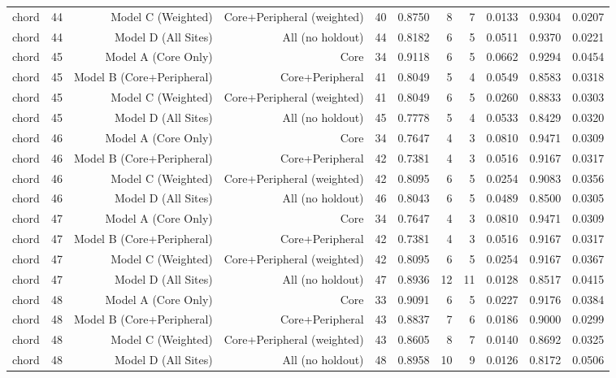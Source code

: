 {\begin{longtable}{lrrrrrrrrrr}
  chord & 44 & Model C (Weighted) & Core+Peripheral (weighted) & 40 & 0.8750 & 8 & 7 & 0.0133 & 0.9304 & 0.0207 \\
  chord & 44 & Model D (All Sites) & All (no holdout) & 44 & 0.8182 & 6 & 5 & 0.0511 & 0.9370 & 0.0221 \\
  chord & 45 & Model A (Core Only) & Core & 34 & 0.9118 & 6 & 5 & 0.0662 & 0.9294 & 0.0454 \\
  chord & 45 & Model B (Core+Peripheral) & Core+Peripheral & 41 & 0.8049 & 5 & 4 & 0.0549 & 0.8583 & 0.0318 \\
  chord & 45 & Model C (Weighted) & Core+Peripheral (weighted) & 41 & 0.8049 & 6 & 5 & 0.0260 & 0.8833 & 0.0303 \\
  chord & 45 & Model D (All Sites) & All (no holdout) & 45 & 0.7778 & 5 & 4 & 0.0533 & 0.8429 & 0.0320 \\
  chord & 46 & Model A (Core Only) & Core & 34 & 0.7647 & 4 & 3 & 0.0810 & 0.9471 & 0.0309 \\
  chord & 46 & Model B (Core+Peripheral) & Core+Peripheral & 42 & 0.7381 & 4 & 3 & 0.0516 & 0.9167 & 0.0317 \\
  chord & 46 & Model C (Weighted) & Core+Peripheral (weighted) & 42 & 0.8095 & 6 & 5 & 0.0254 & 0.9083 & 0.0356 \\
  chord & 46 & Model D (All Sites) & All (no holdout) & 46 & 0.8043 & 6 & 5 & 0.0489 & 0.8500 & 0.0305 \\
  chord & 47 & Model A (Core Only) & Core & 34 & 0.7647 & 4 & 3 & 0.0810 & 0.9471 & 0.0309 \\
  chord & 47 & Model B (Core+Peripheral) & Core+Peripheral & 42 & 0.7381 & 4 & 3 & 0.0516 & 0.9167 & 0.0317 \\
  chord & 47 & Model C (Weighted) & Core+Peripheral (weighted) & 42 & 0.8095 & 6 & 5 & 0.0254 & 0.9167 & 0.0367 \\
  chord & 47 & Model D (All Sites) & All (no holdout) & 47 & 0.8936 & 12 & 11 & 0.0128 & 0.8517 & 0.0415 \\
  chord & 48 & Model A (Core Only) & Core & 33 & 0.9091 & 6 & 5 & 0.0227 & 0.9176 & 0.0384 \\
  chord & 48 & Model B (Core+Peripheral) & Core+Peripheral & 43 & 0.8837 & 7 & 6 & 0.0186 & 0.9000 & 0.0299 \\
  chord & 48 & Model C (Weighted) & Core+Peripheral (weighted) & 43 & 0.8605 & 8 & 7 & 0.0140 & 0.8692 & 0.0325 \\
  chord & 48 & Model D (All Sites) & All (no holdout) & 48 & 0.8958 & 10 & 9 & 0.0126 & 0.8172 & 0.0506 \\

\end{longtable}}
